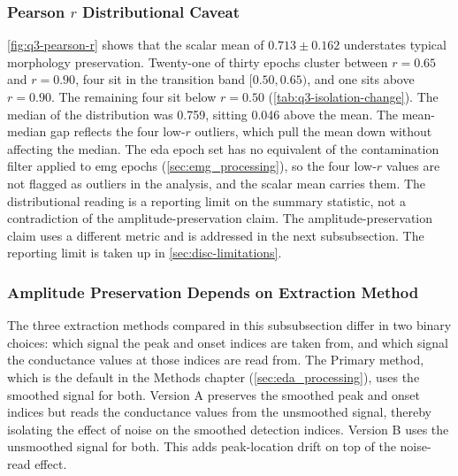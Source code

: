 \subsubsection{Pearson \texorpdfstring{\(r\)}{r} Distributional Caveat}
\label{sec:disc-iso-eda-pearson}

\autoref{fig:q3-pearson-r} shows that the scalar mean of $\num{0.713} \pm \num{0.162}$ understates typical morphology preservation. Twenty-one of thirty epochs cluster between \(r = \num{0.65}\) and \(r = \num{0.90}\), four sit in the transition band \([\num{0.50}, \num{0.65})\), and one sits above \(r = \num{0.90}\). The remaining four sit below \(r = \num{0.50}\) (\autoref{tab:q3-isolation-change}). The median of the distribution was \num{0.759}, sitting \num{0.046} above the mean. The mean-median gap reflects the four low-\(r\) outliers, which pull the mean down without affecting the median. The \gls{eda} epoch set has no equivalent of the contamination filter applied to \gls{emg} epochs (\autoref{sec:emg_processing}), so the four low-\(r\) values are not flagged as outliers in the analysis, and the scalar mean carries them. The distributional reading is a reporting limit on the summary statistic, not a contradiction of the amplitude-preservation claim. The amplitude-preservation claim uses a different metric and is addressed in the next subsubsection. The reporting limit is taken up in \autoref{sec:disc-limitations}.


\subsubsection{Amplitude Preservation Depends on Extraction Method}
\label{sec:disc-iso-eda-extraction}

The three extraction methods compared in this subsubsection differ in two binary choices: which signal the peak and onset indices are taken from, and which signal the conductance values at those indices are read from. The Primary method, which is the default in the Methods chapter (\autoref{sec:eda_processing}), uses the smoothed signal for both. Version A preserves the smoothed peak and onset indices but reads the conductance values from the unsmoothed signal, thereby isolating the effect of noise on the smoothed detection indices. Version B uses the unsmoothed signal for both. This adds peak-location drift on top of the noise-read effect.

